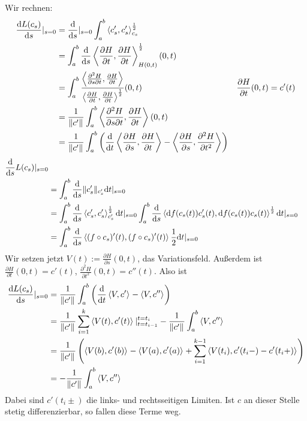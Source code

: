 \documentclass{skript}
\begin{document}
Wir rechnen:
\begin{align*}
  \frac{\d L(c_s)}{\d s}\vert_{s=0} &= \frac{\d}{\d
  s}\vert_{s=0}\int_a^b\sprod[c_s]{c_s', c_s'}^{\frac{1}{2}} \\
  &= \int_a^b\frac{\d}{\d s}\sprod[H(0,t)]{\frac{\partial H}{\partial
  t},\frac{\partial H}{\partial t}}^{\frac{1}{2}}(0,t) \\ &=
  \int_a^b\frac{\sprod{\frac{\partial^2 H}{\partial s\partial t},\frac{\partial
  H}{\partial t}}}{\sprod{\frac{\partial H}{\partial t},\frac{\partial
  H}{\partial t}}^{\frac{1}{2}}}(0,t) & \frac{\partial H}{\partial t}(0,t) =
  c'(t) \\
  &= \frac{1}{\norm{c'}}\int_a^b \sprod{\frac{\partial^2 H}{\partial s\partial
  t},\frac{\partial H}{\partial t}}(0,t) \\
  &= \frac{1}{\norm{c'}}\int_a^b\left(\frac{\d}{\d t}\sprod{\frac{\partial
  H}{\partial s},\frac{\partial H}{\partial t}} - \sprod{\frac{\partial
  H}{\partial s},\frac{\partial^2 H}{\partial t^2}}\right)
\end{align*}
\begin{align*}
  \frac{\d}{\d s}L(c_s)\vert_{s=0} \\
    &= \int_a^b\frac{\d}{\d s} \norm[c_s']{c_s'}\d t\vert_{s=0} \\
    &= \int_a ^b \frac{\d}{\d s}\sprod[c_s']{c_s', c_s'}^\frac12
       \d t\vert_{s=0} \int_a^b \frac{\d}{\d s}
       \sprod{\d f(c_s(t))c_s'(t), \d f(c_s(t))c_s(t)}^\frac12\d t
       \vert_{s=0} \\
    &= \int_a^b\frac{\d}{\d s}\sprod{(f\circ c_s)'(t),(f \circ c_s)'(t)}
       \frac12\d t\vert_{s=0} \\
\end{align*}
Wir setzen jetzt $V(t) := \frac{\partial H}{\partial s}(0,t)$, das
Variationsfeld. Außerdem ist $\frac{\partial H}{\partial t}(0,t) = c'(t)$,
$\frac{\partial^2 H}{\partial t^2}(0,t) = c''(t)$. Also ist 
\begin{align*}
  \frac{\d L(c_s)}{\d s}\vert_{s=0}
    &= \frac1{\norm{c'}}\int_a^b\left(\frac{\d}{\d
  t}\sprod{V,c'}-\sprod{V,c''}\right) \\
  &= \frac{1}{\norm{c'}}\sum_{i=1}^k\sprod{V(t),c'(t)}\vert_{t=t_{i-1}}^{t=t_i}
  - \frac{1}{\norm{c'}}\int_a^b\sprod{V,c''} \\
  &= \frac{1}{\norm{c'}}\left( \sprod{V(b),c'(b)} - \sprod{V(a),c'(a)} +
  \sum_{i=1}^{k-1}\sprod{V(t_i), c'(t_i-)- c'(t_i+)}  \right) \\
  &= - \frac{1}{\norm{c'}}\int_a^b\sprod{V,c''}
\end{align*}
Dabei sind $c'(t_i\pm)$ die links- und rechtsseitigen Limiten. Ist $c$ an dieser
Stelle stetig differenzierbar, so fallen diese Terme weg.
\end{document}
